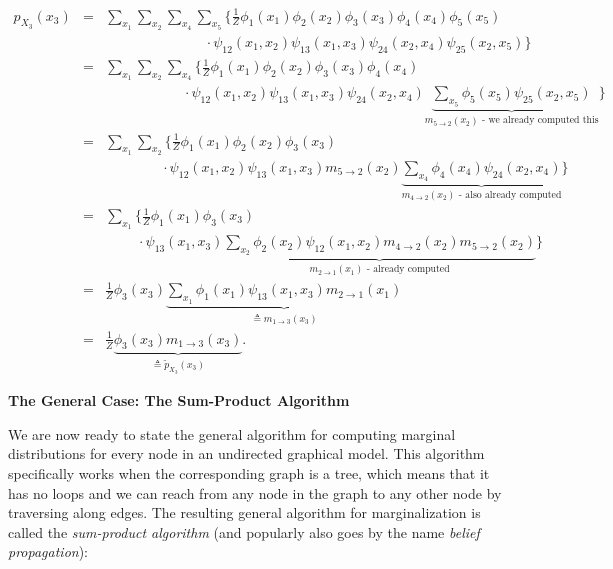 \documentclass[6008notes.tex]{subfiles}
\begin{document}
\begin{eqnarray*}
p_{X_{3}}(x_{3}) & = & \sum_{x_{1}}\sum_{x_{2}}\sum_{x_{4}}\sum_{x_{5}}
\bigg\{ \frac{1}{Z}\phi_{1}(x_{1})\phi_{2}(x_{2})\phi_{3}(x_{3})\phi_{4}(x_{4})\phi_{5}(x_{5}) \\
&&\qquad\qquad\qquad\;\;\;\;
\cdot \psi_{12}(x_{1},x_{2})\psi_{13}(x_{1},x_{3})\psi_{24}(x_{2},x_{4})\psi_{25}(x_{2},x_{5}) \bigg\} \\
 & = & \sum_{x_{1}}\sum_{x_{2}}\sum_{x_{4}}
\bigg\{ \frac{1}{Z}\phi_{1}(x_{1})\phi_{2}(x_{2})\phi_{3}(x_{3})\phi_{4}(x_{4})\\
&&\qquad\qquad\quad\;\;
\cdot \psi_{12}(x_{1},x_{2})\psi_{13}(x_{1},x_{3})\psi_{24}(x_{2},x_{4})\underbrace{\sum_{x_{5}}\phi_{5}(x_{5})\psi_{25}(x_{2},x_{5})}_{m_{5\rightarrow2}(x_{2})\text{ - we already computed this}} \bigg\} \\
 & = & \sum_{x_{1}}\sum_{x_{2}}
\bigg\{ \frac{1}{Z}\phi_{1}(x_{1})\phi_{2}(x_{2})\phi_{3}(x_{3}) \\
&&\qquad\qquad
\cdot \psi_{12}(x_{1},x_{2})\psi_{13}(x_{1},x_{3})m_{5\rightarrow2}(x_{2})\underbrace{\sum_{x_{4}}\phi_{4}(x_{4})\psi_{24}(x_{2},x_{4})}_{m_{4\rightarrow2}(x_{2})\text{ - also already computed}} \bigg\} \\
 & = & \sum_{x_{1}}
\bigg\{ \frac{1}{Z}\phi_{1}(x_{1})\phi_{3}(x_{3}) \\
&&\qquad\;
\cdot \psi_{13}(x_{1},x_{3})\underbrace{\sum_{x_{2}}\phi_{2}(x_{2})\psi_{12}(x_{1},x_{2})m_{4\rightarrow2}(x_{2})m_{5\rightarrow2}(x_{2})}_{m_{2\rightarrow1}(x_{1})\text{ - already computed}} \bigg\} \\
 & = & \frac{1}{Z}\phi_{3}(x_{3})\underbrace{\sum_{x_{1}}\phi_{1}(x_{1})\psi_{13}(x_{1},x_{3})m_{2\rightarrow1}(x_{1})}_{\triangleq m_{1\rightarrow3}(x_{3})}\\
 & = & \frac{1}{Z}\underbrace{\phi_{3}(x_{3})m_{1\rightarrow3}(x_{3})}_{\triangleq\widetilde{p}_{X_{3}}(x_{3})}.
\end{eqnarray*}

\textbf{The General Case: The Sum-Product Algorithm}

We are now ready to state the general algorithm for computing marginal distributions for every node in an undirected graphical model. This algorithm specifically works when the corresponding graph is a tree, which means that it has no loops and we can reach from any node in the graph to any other node by traversing along edges. The resulting general algorithm for marginalization is called the \textit{sum-product algorithm} (and popularly also goes by the name \textit{belief propagation}):
\end{document}
